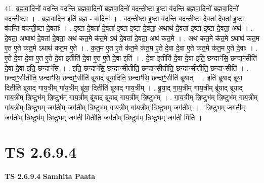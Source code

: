 \documentclass[17pt]{extarticle}
\begin{document}
41. ब्र॒ह्म॒वा॒दिनो॑ वदन्ति वदन्ति ब्रह्मवा॒दिनो᳚ ब्रह्मवा॒दिनो॑ वदन्ती॒ष्टा इ॒ष्टा व॑दन्ति ब्रह्मवा॒दिनो᳚ ब्रह्मवा॒दिनो॑ वदन्ती॒ष्टाः । . ब्र॒ह्म॒वा॒दिन॒ इति॑ ब्रह्म - वा॒दिनः॑ । . व॒द॒न्ती॒ष्टा इ॒ष्टा व॑दन्ति वदन्ती॒ष्टा दे॒वता॑ दे॒वता॑ इ॒ष्टा व॑दन्ति वदन्ती॒ष्टा दे॒वताः᳚ । . इ॒ष्टा दे॒वता॑ दे॒वता॑ इ॒ष्टा इ॒ष्टा दे॒वता॒ अथाथ॑ दे॒वता॑ इ॒ष्टा इ॒ष्टा दे॒वता॒ अथ॑ । . दे॒वता॒ अथाथ॑ दे॒वता॑ दे॒वता॒ अथ॑ कत॒मे क॑त॒मे ऽथ॑ दे॒वता॑ दे॒वता॒ अथ॑ कत॒मे । . अथ॑ कत॒मे क॑त॒मे ऽथाथ॑ कत॒म ए॒त ए॒ते क॑त॒मे ऽथाथ॑ कत॒म ए॒ते । . क॒त॒म ए॒त ए॒ते क॑त॒मे क॑त॒म ए॒ते दे॒वा दे॒वा ए॒ते क॑त॒मे क॑त॒म ए॒ते दे॒वाः । . ए॒ते दे॒वा दे॒वा ए॒त ए॒ते दे॒वा इतीति॑ दे॒वा ए॒त ए॒ते दे॒वा इति॑ । . दे॒वा इतीति॑ दे॒वा दे॒वा इति॒ छन्दाꣳ॑सि॒ छन्दाꣳ॒॒सीति॑ दे॒वा दे॒वा इति॒ छन्दाꣳ॑सि । . इति॒ छन्दाꣳ॑सि॒ छन्दाꣳ॒॒सीतीति॒ छन्दाꣳ॒॒सीतीति॒ छन्दाꣳ॒॒सीतीति॒ छन्दाꣳ॒॒सीति॑ । . छन्दाꣳ॒॒सीतीति॒ छन्दाꣳ॑सि॒ छन्दाꣳ॒॒सीति॑ ब्रूयाद् ब्रूया॒दिति॒ छन्दाꣳ॑सि॒ छन्दाꣳ॒॒सीति॑ ब्रूयात् । . इति॑ ब्रूयाद् ब्रूया॒ दितीति॑ ब्रूयाद् गाय॒त्रीम् गा॑य॒त्रीम् ब्रू॑या॒ दितीति॑ ब्रूयाद् गाय॒त्रीम् । . ब्रू॒या॒द् गा॒य॒त्रीम् गा॑य॒त्रीम् ब्रू॑याद् ब्रूयाद् गाय॒त्रीम् त्रि॒ष्टुभ॑म् त्रि॒ष्टुभ॑म् गाय॒त्रीम् ब्रू॑याद् ब्रूयाद् गाय॒त्रीम् त्रि॒ष्टुभ᳚म् । . गा॒य॒त्रीम् त्रि॒ष्टुभ॑म् त्रि॒ष्टुभ॑म् गाय॒त्रीम् गा॑य॒त्रीम् त्रि॒ष्टुभ॒म् जग॑ती॒म् जग॑तीम् त्रि॒ष्टुभ॑म् गाय॒त्रीम् गा॑य॒त्रीम् त्रि॒ष्टुभ॒म् जग॑तीम् । . त्रि॒ष्टुभ॒म् जग॑ती॒म् जग॑तीम् त्रि॒ष्टुभ॑म् त्रि॒ष्टुभ॒म् जग॑ती॒ मितीति॒ जग॑तीम् त्रि॒ष्टुभ॑म् त्रि॒ष्टुभ॒म् जग॑ती॒ मिति॑ । \newline
\pagebreak
{}
\section*{ TS 2.6.9.4 }

\textbf{TS 2.6.9.4 } \newline
\textbf{Samhita Paata} \newline
\end{document}
